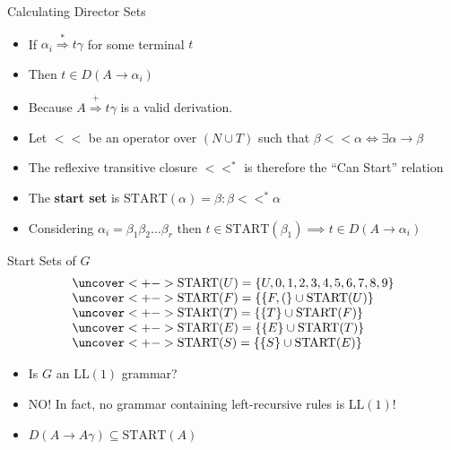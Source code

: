\documentclass[]{beamer}
\begin{document}
\begin{frame}{Calculating Director Sets}
  \begin{itemize}[<+->]
      \item If $\alpha_i \stackrel{*}{\Rightarrow} t \gamma$ for some terminal $t$
      \item Then $t \in D(A \rightarrow \alpha_i)$
      \item Because $A \stackrel{+}{\Rightarrow} t \gamma$ is a valid derivation.
      \item Let $<<$ be an operator over $(N \cup T)$ such that $\beta << \alpha \iff \exists \alpha \rightarrow \beta$
      \item The reflexive transitive closure $<<^*$ is therefore the ``Can Start'' relation
      \item The \textbf{start set} is $\mathrm{START}(\alpha) = \beta : \beta <<^* \alpha$ 
      \item Considering $\alpha_i = \beta_1\beta_2\ldots\beta_r$ then $t \in \mathrm{START}(\beta_1) \implies t \in D(A \rightarrow \alpha_i)$
  \end{itemize}
\end{frame}

\begin{frame}{Start Sets of $G$}
  \[
    \begin{array}{l}
      \uncover<+->{\mathrm{START}(U) = \{U,0,1,2,3,4,5,6,7,8,9\}}\\
      \uncover<+->{\mathrm{START}(F) = \{\{F,(\} \cup \mathrm{START}(U)\}}\\
      \uncover<+->{\mathrm{START}(T) = \{\{T\} \cup \mathrm{START}(F)\}}\\
      \uncover<+->{\mathrm{START}(E) = \{\{E\} \cup \mathrm{START}(T)\}}\\
      \uncover<+->{\mathrm{START}(S) = \{\{S\} \cup \mathrm{START}(E)\}}\\
    \end{array}
  \]
  \begin{itemize}[<+->]
    \item Is $G$ an $\mathrm{LL(1)}$ grammar?
    \item NO!  In fact, no grammar containing left-recursive rules is $\mathrm{LL}(1)$!
    \item $D(A \rightarrow A \gamma) \subseteq \mathrm{START}(A)$
  \end{itemize}
\end{frame}
\end{document}

